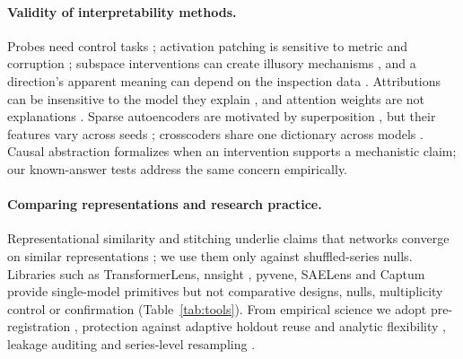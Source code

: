 \paragraph{Validity of interpretability methods.} Probes need control tasks \citep{hewitt2019control,belinkov2022probing};
activation patching is sensitive to metric and corruption \citep{zhang2024patching,heimersheim2024patching}; subspace
interventions can create illusory mechanisms \citep{makelov2024illusion}, and a direction's apparent meaning can depend
on the inspection data \citep{bolukbasi2021illusion}. Attributions can be insensitive to the model they explain
\citep{adebayo2018sanity}, and attention weights are not explanations \citep{jain2019attention}. Sparse autoencoders are
motivated by superposition \citep{elhage2022superposition,cunningham2024sae,templeton2024scaling}, but their features vary
across seeds \citep{paulo2025seeds}; crosscoders share one dictionary across models \citep{lindsey2024crosscoders}.
Causal abstraction \citep{geiger2021causal} formalizes when an intervention supports a mechanistic claim; our
known-answer tests address the same concern empirically.

\paragraph{Comparing representations and research practice.} Representational similarity
\citep{raghu2017svcca,morcos2018pwcca,kornblith2019cka,kriegeskorte2008rsa} and stitching
\citep{lenc2015equivariance,bansal2021stitching} underlie claims that networks converge on similar representations
\citep{li2016convergent,huh2024platonic}; we use them only against shuffled-series nulls. Libraries such as
TransformerLens, nnsight \citep{fiottokaufman2025nnsight}, pyvene, SAELens \citep{bloom2024saelens} and Captum
\citep{kokhlikyan2020captum} provide single-model primitives but not comparative designs, nulls, multiplicity control or
confirmation (Table~\ref{tab:tools}). From empirical science we adopt pre-registration \citep{nosek2018preregistration},
protection against adaptive holdout reuse \citep{dwork2015reusable} and analytic flexibility
\citep{gelman2014garden,simonsohn2020specification}, leakage auditing \citep{kapoor2023leakage} and series-level
resampling \citep{efron1993bootstrap,cameron2008cluster}.

